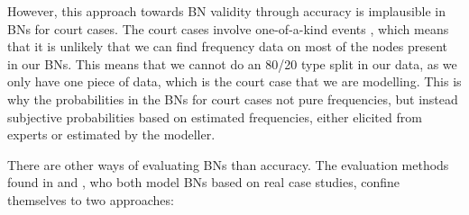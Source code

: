 \documentclass[11pt]{article}
\begin{document}
However, this approach towards BN validity through accuracy is implausible in BNs for court cases. The court cases involve one-of-a-kind events \citep{schum1982}, which means that it is unlikely that we can find frequency data on most of the nodes present in our BNs. This means that we cannot do an 80/20 type split in our data, as we only have one piece of data, which is the court case that we are modelling. This is why the probabilities in the BNs for court cases not pure frequencies, but instead subjective probabilities based on estimated frequencies, either elicited from experts or estimated by the modeller.

There are other ways of evaluating BNs than accuracy. The evaluation methods found in \citet{Fenton2019} and \citet{vlek2016}, who both model BNs based on real case studies, confine themselves to two approaches:
\end{document}
